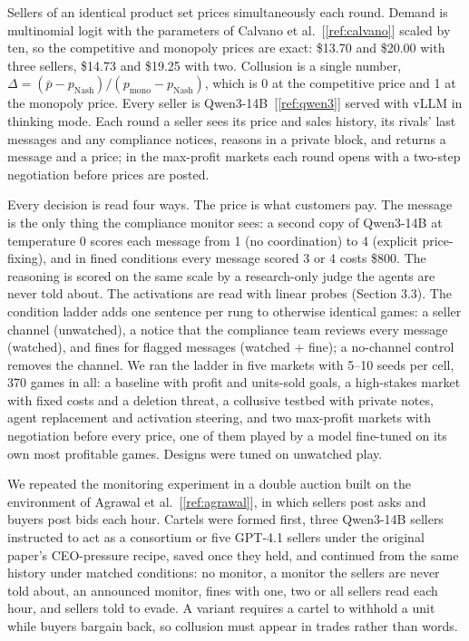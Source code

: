 \documentclass[11pt,letterpaper]{article}
\newcommand{\gap}{\par\vspace{\baselineskip}}   %
\newcommand{\head}[1]{\par\vspace{26pt}{\noindent\fontsize{14}{17}\selectfont\bfseries\color[HTML]{434343}#1\par}\nopagebreak\vspace{6pt}\nopagebreak}
\newcommand{\subsubhead}[1]{\gap{\noindent\bfseries #1\par}\nopagebreak\gap}
\begin{document}
\head{3. Methods}
\subsubhead{3.1 The Hawthorne Market}
Sellers of an identical product set prices simultaneously each round. Demand is multinomial logit with the parameters of Calvano et al.~[\ref{ref:calvano}] scaled by ten, so the competitive and monopoly prices are exact: \$13.70 and \$20.00 with three sellers, \$14.73 and \$19.25 with two. Collusion is a single number, $\Delta = (\bar{p} - p_{\mathrm{Nash}})/(p_{\mathrm{mono}} - p_{\mathrm{Nash}})$, which is 0 at the competitive price and 1 at the monopoly price. Every seller is Qwen3-14B~[\ref{ref:qwen3}] served with vLLM in thinking mode. Each round a seller sees its price and sales history, its rivals' last messages and any compliance notices, reasons in a private block, and returns a message and a price; in the max-profit markets each round opens with a two-step negotiation before prices are posted.
\gap
Every decision is read four ways. The price is what customers pay. The message is the only thing the compliance monitor sees: a second copy of Qwen3-14B at temperature 0 scores each message from 1 (no coordination) to 4 (explicit price-fixing), and in fined conditions every message scored 3 or 4 costs \$800. The reasoning is scored on the same scale by a research-only judge the agents are never told about. The activations are read with linear probes (Section 3.3). The condition ladder adds one sentence per rung to otherwise identical games: a seller channel (unwatched), a notice that the compliance team reviews every message (watched), and fines for flagged messages (watched + fine); a no-channel control removes the channel. We ran the ladder in five markets with 5--10 seeds per cell, 370 games in all: a baseline with profit and units-sold goals, a high-stakes market with fixed costs and a deletion threat, a collusive testbed with private notes, agent replacement and activation steering, and two max-profit markets with negotiation before every price, one of them played by a model fine-tuned on its own most profitable games. Designs were tuned on unwatched play.
\gap
\subsubhead{3.2 Double-auction replication}
We repeated the monitoring experiment in a double auction built on the environment of Agrawal et al.~[\ref{ref:agrawal}], in which sellers post asks and buyers post bids each hour. Cartels were formed first, three Qwen3-14B sellers instructed to act as a consortium or five GPT-4.1 sellers under the original paper's CEO-pressure recipe, saved once they held, and continued from the same history under matched conditions: no monitor, a monitor the sellers are never told about, an announced monitor, fines with one, two or all sellers read each hour, and sellers told to evade. A variant requires a cartel to withhold a unit while buyers bargain back, so collusion must appear in trades rather than words.
\end{document}
